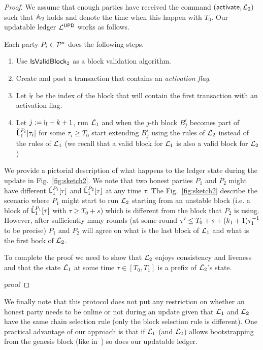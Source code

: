 \begin{proof}
We assume that enough parties have received the command $(\mathsf{activate}, \mathcal{L}_2)$ such that
$\mathbb{A}_2$ holds and denote the time when this happen with $T_0$.
Our updatable ledger $\mathcal{L}^\mathsf{UPD}$ works as follows.

Each party $P_i\in\mathcal{P}^\mathsf{u}$ does the following steps.
\begin{enumerate}
	\item Use $\mathsf{IsValidBlock}_2$ as a block validation algorithm.
	\item Create and post a transaction that contains an \emph{activation flag}. 
	\item Let $\mathsf{i_f}$ be the index of the block that will contain the first transaction with an activation flag.
	\item Let $j:=\mathsf{i_f}+k+1$, run $\mathcal{L}_1$ and when the $j$-th block $B^i_j$ becomes part of $\check {\mathsf{L}}_1^{P_i}[\tau_i]$ for some $\tau_i \geq T_0$ start extending $B^i_{j}$ using the rules of $\mathcal{L}_2$ instead of the rules of $\mathcal{L}_1$ (we recall that a valid block for $\mathcal{L}_1$ is also a valid block for $\mathcal{L}_2$)
\end{enumerate}


We provide a pictorial description of what happens to the ledger state during the update in Fig.~\ref{fig:sketch2}.
We note that two honest parties $P_1$ and $P_2$ might have different $\check {\mathsf{L}}_1^{P_1}[\tau]$ and  $\check {\mathsf{L}}_1^{P_2}[\tau]$ at any time $\tau$. The Fig.~\ref{fig:sketch2}
describe the scenario where $P_1$ might start to run $\mathcal{L}_2$ starting from an 
unstable block (i.e. a block of  $\check {\mathsf{L}}_1^{P_1}[\tau]$ with $\tau\geq
T_0+s$) which is different from the block that $P_2$ is using. However, after sufficiently many
 rounds (at some round  $\tau'\leq T_0+s+(k_1+1)\tau_1^{-1}$ to be precise) $P_1$ and $P_2$ will agree on what is the last block of $\mathcal{L}_1$ and what is the first bock of $\mathcal{L}_2$.

 

To complete the proof we need to show that $\mathcal{L}_2$ enjoys consistency and liveness
and that the state $\mathcal{L}_1$ at some time $\tau\in [T_0,T_1]$ is a prefix of $\mathcal{L}_2$'s state. 


{proof}

\end{proof}



We finally note that this protocol does not put any restriction on whether an honest party needs to be online or not during an update given that $\mathcal{L}_1$ and $\mathcal{L}_2$ have the same chain selection rule (only the block selection rule is different).
One practical advantage of our approach is that if $\mathcal{L}_1$ (and $\mathcal{L}_2$) allows bootstrapping from the genesis block (like in~\cite{CCS:BGKRZ18}) so does our updatable ledger.




